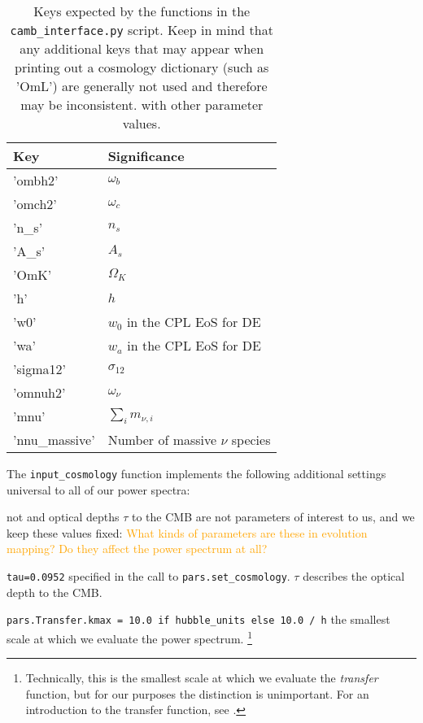 \begin{table}[ht!]
\centering
\begin{tabular}{l|l}
\hline
Key & Significance \\ \hline
'ombh2' & $\omega_b$ \\
'omch2' & $\omega_c$ \\
'n\_s' & $n_s$ \\
'A\_s' & $A_s$ \\
'OmK' & $\Omega_K$ \\
'h' & $h$ \\
'w0' & $w_0$ in the CPL EoS for DE \\
'wa' & $w_a$ in the CPL EoS for DE \\
'sigma12' & $\sigma_{12}$\footnotemark \\
'omnuh2' & $\omega_\nu$ \\
'mnu' & $\sum_i m_{\nu, i}$ \\
'nnu\_massive' & Number of massive $\nu$ species \\ \hline
\end{tabular}
 \cprotect\caption[Cosmology Dictionary Keys]{Keys
 	expected by the functions in
 	the \verb|camb_interface.py| script. Keep in mind that any additional
 	keys that may appear when printing out a cosmology dictionary
 	(such as 'OmL') are generally not used and therefore may be inconsistent.
 	with other parameter values.}
 \label{tab: cosmology_dictionary}
\end{table}
 	

The \verb|input_cosmology| function implements the following additional
settings universal to all of our power spectra:

 not and optical depths $\tau$ to the CMB 
are not parameters of interest to us, and we keep these values fixed:
\textcolor{orange}{What kinds of parameters are these in evolution mapping?
Do they affect the power spectrum at all?}

\verb|tau=0.0952| \quad specified in the call to \verb|pars.set_cosmology|.
$\tau$ describes the optical depth to the CMB.


\verb|pars.Transfer.kmax = 10.0 if hubble_units else 10.0 / h| \quad the smallest scale at which we evaluate the power spectrum.
\footnote{Technically, this is the smallest scale at which we evaluate the
\textit{transfer} function, but for our purposes the distinction is
unimportant. For an introduction to the transfer function, see \citet{FECS}.} 

